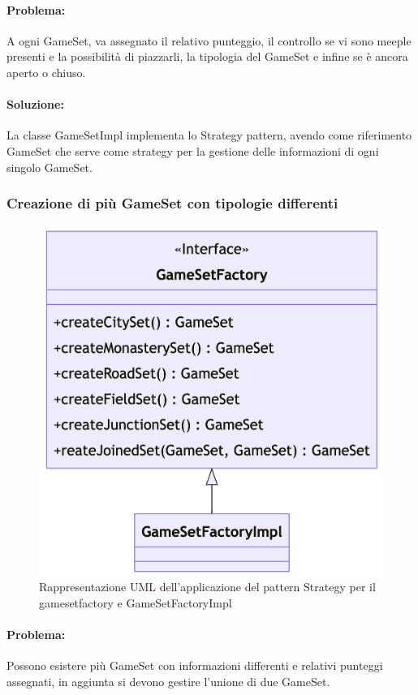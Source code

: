 \paragraph{Problema:}
A ogni GameSet, va assegnato il relativo punteggio, il controllo se vi sono meeple presenti e la possibilità di piazzarli, la tipologia del GameSet e infine se è ancora aperto o chiuso.
\paragraph{Soluzione:}
La classe GameSetImpl implementa lo Strategy pattern, avendo come riferimento GameSet che serve come strategy per la gestione delle informazioni di ogni singolo GameSet.

\subsubsection*{Creazione di più GameSet con tipologie differenti}
\begin{figure}[ht]
    \centering\includegraphics[scale=.3]{images/gamesetfactory.png}
    \caption{Rappresentazione UML dell'applicazione del pattern Strategy per il gamesetfactory e GameSetFactoryImpl}
\end{figure}

\paragraph{Problema:}
Possono esistere più GameSet con informazioni differenti e relativi punteggi assegnati, in aggiunta si devono gestire l'unione di due GameSet.
